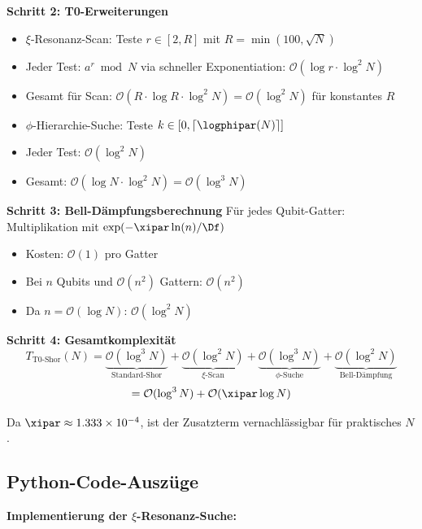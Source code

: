 \textbf{Schritt 2: T0-Erweiterungen}
\begin{itemize}
	\item $\xi$-Resonanz-Scan: Teste $r \in [2, R]$ mit $R = \min(100, \sqrt{N})$
	\item Jeder Test: $a^r \bmod N$ via schneller Exponentiation: $\mathcal{O}(\log r \cdot \log^2 N)$
	\item Gesamt für Scan: $\mathcal{O}(R \cdot \log R \cdot \log^2 N) = \mathcal{O}(\log^2 N)$ für konstantes $R$
	\item $\phi$-Hierarchie-Suche: Teste $k \in [0, \lceil \logphipar(N) \rceil]$
	\item Jeder Test: $\mathcal{O}(\log^2 N)$
	\item Gesamt: $\mathcal{O}(\log N \cdot \log^2 N) = \mathcal{O}(\log^3 N)$
\end{itemize}

\textbf{Schritt 3: Bell-Dämpfungsberechnung}
Für jedes Qubit-Gatter: Multiplikation mit $\exp(-\xipar \ln(n)/\Df)$
\begin{itemize}
	\item Kosten: $\mathcal{O}(1)$ pro Gatter
	\item Bei $n$ Qubits und $\mathcal{O}(n^2)$ Gattern: $\mathcal{O}(n^2)$
	\item Da $n = \mathcal{O}(\log N)$: $\mathcal{O}(\log^2 N)$
\end{itemize}

\textbf{Schritt 4: Gesamtkomplexität}
\[
T_{\text{T0-Shor}}(N) = \underbrace{\mathcal{O}(\log^3 N)}_{\text{Standard-Shor}} 
+ \underbrace{\mathcal{O}(\log^2 N)}_{\xi\text{-Scan}} 
+ \underbrace{\mathcal{O}(\log^3 N)}_{\phi\text{-Suche}} 
+ \underbrace{\mathcal{O}(\log^2 N)}_{\text{Bell-Dämpfung}}
\]
\[
= \mathcal{O}(\log^3 N) + \mathcal{O}(\xipar \log N)
\]

Da $\xipar \approx 1.333\times 10^{-4}$, ist der Zusatzterm vernachlässigbar für praktisches $N$.

\subsection{Python-Code-Auszüge}
\label{app:code}

\textbf{Implementierung der $\xi$-Resonanz-Suche:}

